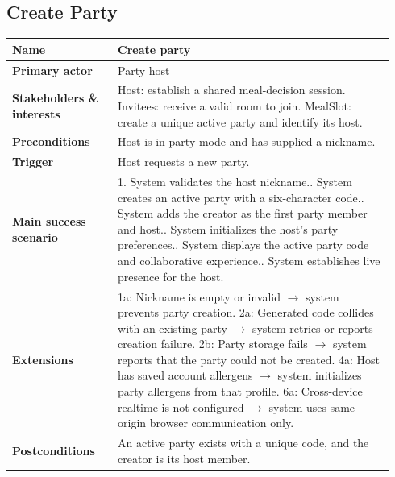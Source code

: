 \documentclass[sigconf]{acmart}
\begin{document}
\subsection*{Create Party}
{\footnotesize
\begin{supertabular}{@{}p{0.26\linewidth}p{0.68\linewidth}@{}}
\textbf{Name} & Create party \\
\hline
\textbf{Primary actor} & Party host \\
\hline
\textbf{Stakeholders \& interests} & Host: establish a shared meal-decision session. Invitees: receive a valid room to join. MealSlot: create a unique active party and identify its host. \\
\hline
\textbf{Preconditions} & Host is in party mode and has supplied a nickname. \\
\hline
\textbf{Trigger} & Host requests a new party. \\
\hline
\textbf{Main success scenario} & 1. System validates the host nickname.. System creates an active party with a six-character code.. System adds the creator as the first party member and host.. System initializes the host's party preferences.. System displays the active party code and collaborative experience.. System establishes live presence for the host. \\
\hline
\textbf{Extensions} & 1a: Nickname is empty or invalid $\rightarrow$ system prevents party creation.\newline
2a: Generated code collides with an existing party $\rightarrow$ system retries or reports creation failure.\newline
2b: Party storage fails $\rightarrow$ system reports that the party could not be created.\newline
4a: Host has saved account allergens $\rightarrow$ system initializes party allergens from that profile.\newline
6a: Cross-device realtime is not configured $\rightarrow$ system uses same-origin browser communication only. \\
\hline
\textbf{Postconditions} & An active party exists with a unique code, and the creator is its host member. \\
\end{supertabular}
}
\end{document}
